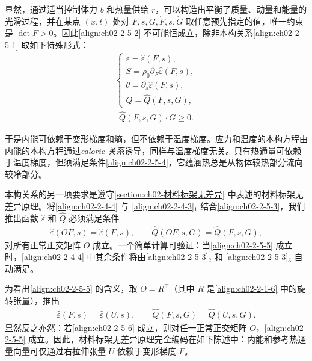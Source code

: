\documentclass[../../main.tex]{subfiles}
\begin{document}
显然，通过适当控制体力 $b$ 和热量供给 $r$，可以构造出平衡了质量、动量和能量的光滑过程，并在某点 $(x,t)$ 处对 $F,s,G,\dot{F},\dot{s},\dot{G}$ 取任意预先指定的值，唯一约束是 $\det F>0$。因此\eqref{align:ch02-2-5-2} 不可能恒成立，除非本构关系\eqref{align:ch02-2-5-1} 取如下特殊形式：
\begin{align}
\begin{cases}
\varepsilon=\hat{\varepsilon}(F,s),\\
S=\rho_{0}\partial_{F}\hat{\varepsilon}(F,s),\\
\theta=\partial_{s}\hat{\varepsilon}(F,s),\\
Q=\hat{Q}(F,s,G),
\end{cases}
\label{align:ch02-2-5-3}
\end{align}
\begin{align}
\hat{Q}(F,s,G)\cdot G\geqslant 0.
\label{align:ch02-2-5-4}
\end{align}

于是内能可依赖于变形梯度和熵，但不依赖于温度梯度。应力和温度的本构方程由内能的本构方程通过\emph{caloric 关系}诱导，同样与温度梯度无关。只有热通量可依赖于温度梯度，但须满足条件\eqref{align:ch02-2-5-4}，它蕴涵热总是从物体较热部分流向较冷部分。

本构关系的另一项要求是遵守\cref{section:ch02-材料标架无差异} 中表述的材料标架无差异原理。将\eqref{align:ch02-2-4-4} 与 \eqref{align:ch02-2-4-3}$_{1}$ 结合\eqref{align:ch02-2-5-3}，我们推出函数 $\hat{\varepsilon}$ 和 $\hat{Q}$ 必须满足条件
\begin{align}
\hat{\varepsilon}(OF,s)=\hat{\varepsilon}(F,s),\qquad\hat{Q}(OF,s,G)=\hat{Q}(F,s,G),
\label{align:ch02-2-5-5}
\end{align}
对所有正常正交矩阵 $O$ 成立。一个简单计算可验证：当\eqref{align:ch02-2-5-5} 成立时，\eqref{align:ch02-2-4-4} 中其余条件将由\eqref{align:ch02-2-5-3}$_{2}$ 和 \eqref{align:ch02-2-5-3}$_{3}$ 自动满足。

为看出\eqref{align:ch02-2-5-5} 的含义，取 $O=R^{\top}$（其中 $R$ 是\eqref{align:ch02-2-1-6} 中的旋转张量），推出
\begin{align}
\hat{\varepsilon}(F,s)=\hat{\varepsilon}(U,s),\qquad\hat{Q}(F,s,G)=\hat{Q}(U,s,G).
\label{align:ch02-2-5-6}
\end{align}
显然反之亦然：若\eqref{align:ch02-2-5-6} 成立，则对任一正常正交矩阵 $O$，\eqref{align:ch02-2-5-5} 成立。因此，材料标架无差异原理完全编码在如下陈述中：内能和参考热通量向量可仅通过右拉伸张量 $U$ 依赖于变形梯度 $F$。
\end{document}

